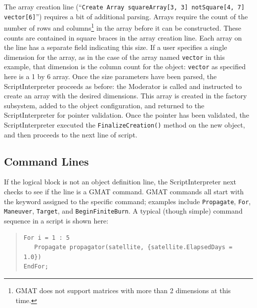 The array creation line (``\texttt{Create Array squareArray[3, 3] notSquare[4, 7] vector[6]}'')
requires a bit of additional parsing.  Arrays require the count of the number of rows and
columns\footnote{GMAT does not support matrices with more than 2 dimensions at this time.} in
the array before it can be constructed.  These counts are contained in square braces in the array
creation line.  Each array on the line has a separate field indicating this size.  If a user
specifies a single dimension for the array, as in the case of the array named \texttt{vector} in
this example, that dimension is the column count for the object: \texttt{vector} as specified here
is a 1 by 6 array.  Once the size parameters have been parsed, the ScriptInterpreter proceeds as
before: the Moderator is called and instructed to create an array with the desired dimensions.  This
array is created in the factory subsystem, added to the object configuration, and returned to the
ScriptInterpreter for pointer validation.  Once the pointer has been validated, the
ScriptInterpreter executed the \texttt{FinalizeCreation()} method on the new object, and then
proceeds to the next line of script.

\subsection{\label{section:ParsingCommands}Command Lines}

If the logical block is not an object definition line, the ScriptInterpreter next checks to see if
the line is a GMAT command.  GMAT commands all start with the keyword assigned to the specific
command; examples include \texttt{Propagate}, \texttt{For}, \texttt{Maneuver}, \texttt{Target}, and
\texttt{BeginFiniteBurn}.  A typical (though simple) command sequence in a script is shown here:

\begin{quote}
\begin{verbatim}
For i = 1 : 5
   Propagate propagator(satellite, {satellite.ElapsedDays = 1.0})
EndFor;
\end{verbatim}
\end{quote}

